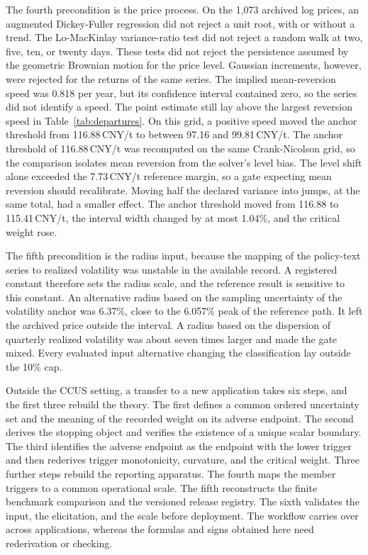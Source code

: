 The fourth precondition is the price process. On the 1,073 archived log prices, an augmented Dickey-Fuller regression did not reject a unit root, with or without a trend. The Lo-MacKinlay variance-ratio test did not reject a random walk at two, five, ten, or twenty days. These tests did not reject the persistence assumed by the geometric Brownian motion for the price level. Gaussian increments, however, were rejected for the returns of the same series. The implied mean-reversion speed was 0.818 per year, but its confidence interval contained zero, so the series did not identify a speed. The point estimate still lay above the largest reversion speed in Table~\ref{tab:departures}. On this grid, a positive speed moved the anchor threshold from 116.88\,CNY/t to between 97.16 and 99.81\,CNY/t. The anchor threshold of 116.88\,CNY/t was recomputed on the same Crank-Nicolson grid, so the comparison isolates mean reversion from the solver's level bias. The level shift alone exceeded the 7.73\,CNY/t reference margin, so a gate expecting mean reversion should recalibrate. Moving half the declared variance into jumps, at the same total, had a smaller effect. The anchor threshold moved from 116.88 to 115.41\,CNY/t, the interval width changed by at most 1.04\%, and the critical weight rose.

The fifth precondition is the radius input, because the mapping of the policy-text series to realized volatility was unstable in the available record. A registered constant therefore sets the radius scale, and the reference result is sensitive to this constant. An alternative radius based on the sampling uncertainty of the volatility anchor was 6.37\%, close to the 6.057\% peak of the reference path. It left the archived price outside the interval. A radius based on the dispersion of quarterly realized volatility was about seven times larger and made the gate mixed. Every evaluated input alternative changing the classification lay outside the 10\% cap.

Outside the CCUS setting, a transfer to a new application takes six steps, and the first three rebuild the theory. The first defines a common ordered uncertainty set and the meaning of the recorded weight on its adverse endpoint. The second derives the stopping object and verifies the existence of a unique scalar boundary. The third identifies the adverse endpoint as the endpoint with the lower trigger and then rederives trigger monotonicity, curvature, and the critical weight. Three further steps rebuild the reporting apparatus. The fourth maps the member triggers to a common operational scale. The fifth reconstructs the finite benchmark comparison and the versioned release registry. The sixth validates the input, the elicitation, and the scale before deployment. The workflow carries over across applications, whereas the formulas and signs obtained here need rederivation or checking.

